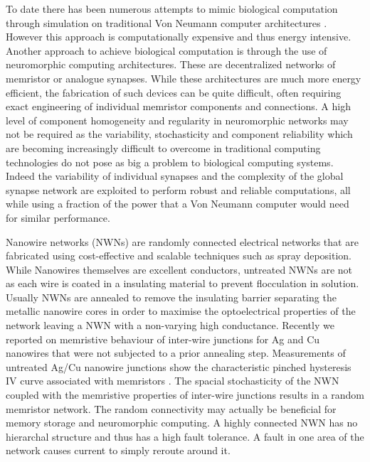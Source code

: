 To date there has been numerous attempts to mimic biological computation through simulation on traditional Von Neumann computer architectures \cite{indiveri2013}. However this approach is computationally expensive and thus energy intensive. Another approach to achieve biological computation is through the use of neuromorphic computing architectures\cite{prezioso2015,yang2013}. These are decentralized networks of memristor or analogue synapses. While these architectures are much more energy efficient, the fabrication of such devices can be quite difficult, often requiring exact engineering of individual memristor components and connections. A high level of component homogeneity and regularity in neuromorphic networks may not be required as the variability, stochasticity and component reliability which are becoming increasingly difficult to overcome in traditional computing technologies do not pose as big a problem to biological computing systems\cite{querlioz2013}. Indeed the variability of individual synapses and the complexity of the global synapse network are exploited to perform robust and reliable computations, all while using a fraction of the power that a Von Neumann computer would need for similar performance. 

Nanowire networks (NWNs) are randomly connected electrical networks that are fabricated using cost-effective and scalable techniques such as spray deposition\cite{rocha2015,deng2015}. While Nanowires themselves are excellent conductors, untreated NWNs are not as each wire is coated in a insulating material to prevent flocculation in solution. Usually NWNs are annealed to remove the insulating barrier separating the metallic nanowire cores in order to maximise the optoelectrical properties of the network leaving a NWN with a non-varying high conductance\cite{rocha2015}. Recently we reported on memristive behaviour of inter-wire junctions for Ag and Cu nanowires that were not subjected to a prior annealing step. Measurements of untreated Ag/Cu nanowire junctions show the characteristic pinched hysteresis IV curve associated with memristors \cite{chua2014}. The spacial stochasticity of the NWN coupled with the memristive properties of inter-wire junctions results in a random memristor network. The random connectivity may actually be beneficial for memory storage and neuromorphic computing. A highly connected NWN has no hierarchal structure and thus has a high fault tolerance. A fault in one area of the network causes current to simply reroute around it. 

